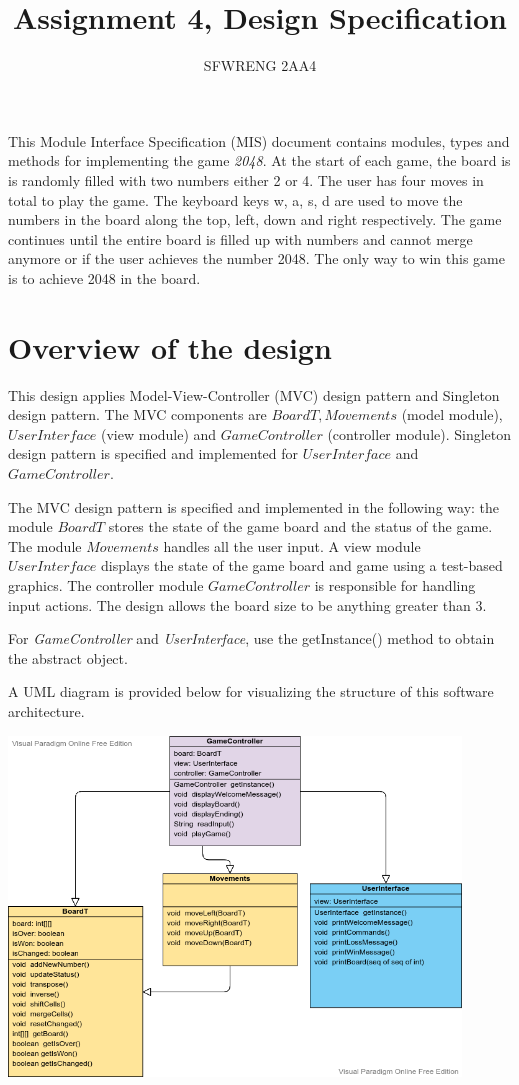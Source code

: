 \documentclass[12pt]{article}
\title{Assignment 4, Design Specification}
\author{SFWRENG 2AA4}
\begin{document}
\maketitle
This Module Interface Specification (MIS) document contains modules, types and
methods for implementing the game \textit{2048}. At the start of each game, the board is is randomly filled with two numbers either 2 or 4. The user has four moves in total to play the game. The keyboard keys w, a, s, d are used to move the numbers in the board along the top, left, down and right respectively. The game continues until the entire board is filled up with numbers and cannot merge anymore or if the user achieves the number 2048. The only way to win this game is to achieve 2048 in the board.

\section{Overview of the design}
This design applies Model-View-Controller (MVC) design pattern and Singleton design pattern. The MVC components are $BoardT, Movements$ (model module), $UserInterface$ (view module) and $GameController$ (controller module). Singleton design pattern is specified and implemented for $UserInterface$ and $GameController$.

\medskip

The MVC design pattern is specified and implemented in the following way: the module $BoardT$ stores the state of the game board and the status of the game. The module $Movements$ handles all the user input. A view module $UserInterface$ displays the state of the game board and game using a test-based graphics. The controller module $GameController$ is responsible for handling input actions. The design allows the board size to be anything greater than 3.


\medskip
For \textit{GameController} and \textit{UserInterface}, use the getInstance() method to obtain the abstract object.

\bigskip

\noindent A UML diagram is provided below for visualizing the structure of this software architecture.

\includegraphics[width=0.9\textwidth]{MVC-UML.png}
\end{document}
